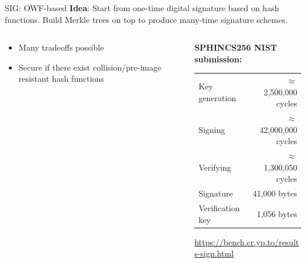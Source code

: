 \documentclass[xcolor=table,10pt,aspectratio=169]{beamer}
\begin{document}
\begin{frame}[label={sec:org540305a}]{SIG: OWF-based}
\textbf{Idea}: Start from one-time digital signature based on hash functions. Build Merkle trees on top to produce many-time signature schemes.

\begin{columns}[t]
\begin{column}{0.5\columnwidth}
\begin{itemize}
\item Many tradeoffs possible
\item Secure if there exist collision/pre-image resistant hash functions
\end{itemize}
\end{column}

\begin{column}{0.5\columnwidth}
\textbf{SPHINCS256 NIST submission:}

\begin{center}
\begin{tabular}{lr}
Key generation & \(\approx\)  2,500,000 cycles\\
Signing & \(\approx\) 42,000,000 cycles\\
Verifying & \(\approx\)  1,300,050 cycles\\
Signature & 41,000 bytes\\
Verification key & 1,056 bytes\\
\end{tabular}

\end{center}

\small \url{https://bench.cr.yp.to/results-sign.html}
\end{column}
\end{columns}
\end{frame}
\end{document}
